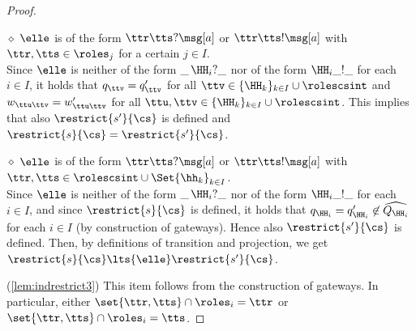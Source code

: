 \begin{proof}
\begin{description}
\item
\underline{$\diamond$}
$\elle$ is of the form $\ttr\tts?\msg[a]$ or $\ttr\tts!\msg[a]$
with $\ttr,\tts \in \roles_j$ for a certain $j\in I$.\\ 
Since $\elle$ is neither of the form $\_\,\HH_i?\_$ nor of the form $\HH_i\_!\_$
for each $i\in I$,
it holds that $q_\ttv = q'_\ttv$ for all $\ttv \in  \{\HH_k\}_{k \in I}\cup\rolescsint$
and $w_{\ttu\ttv} = w'_{\ttu\ttv}$ for all $\ttu,\ttv \in \{\HH_k\}_{k \in I}\cup\rolescsint$.
This implies that also $\restrict{s'}{\cs}$ is defined and $\restrict{s}{\cs}=\restrict{s'}{\cs}$.

\item
\underline{$\diamond$}
 $\elle$ is of the form $\ttr\tts?\msg[a]$ or $\ttr\tts!\msg[a]$
with $\ttr,\tts \in \rolescsint\cup\Set{\hh_k}_{k\in I}$. \\ 
Since $\elle$ is neither of the form $\_\,\HH_i?\_$ nor of the form $\HH_i\_!\_$ for each $i\in I$,
and since $\restrict{s}{\cs}$ is defined,
it holds that   
$q_{\HH_i}=  q'_{\HH_i} \not\in \widehat{Q_{\HH_i}}$ for each $i\in I$ (by construction of gateways). Hence also $\restrict{s'}{\cs}$ is defined.
Then, by definitions of transition and projection, we get $\restrict{s}{\cs}\lts{\elle}\restrict{s'}{\cs}$.
\end{description}

%
%
(\ref{lem:indrestrict3}) This item follows from the construction of gateways.
In particular, either $\set{\ttr,\tts} \cap \roles_i=\ttr$ or $\set{\ttr,\tts} \cap \roles_i=\tts$. 
%
\end{proof}

